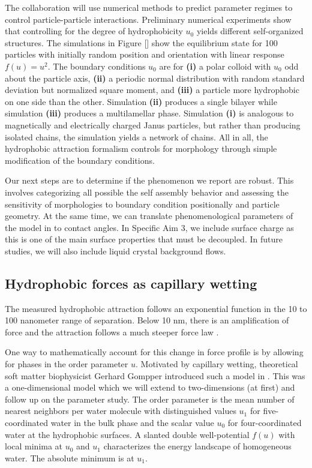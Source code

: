 The collaboration will use numerical methods to predict parameter regimes 
to control particle-particle interactions.  Preliminary numerical experiments
show that controlling for the degree of hydrophobicity $u_0$ yields different
self-organized structures.  The simulations in Figure [] show the equilibrium
state for 100 particles with initially random position and orientation
with linear response $f(u) = u^2$.  The 
boundary conditions $u_0$ are for \textbf{(i)} a polar colloid with $u_0$
odd about the particle axis, \textbf{(ii)} a periodic normal distribution
with random standard deviation but normalized square moment, and  
\textbf{(iii)} a particle more hydrophobic on one side than the other. 
Simulation \textbf{(ii)}  produces a single bilayer while simulation
\textbf{(iii)} produces a multilamellar phase.  Simulation \textbf{(i)} is
analogous to magnetically and electrically charged Janus particles, but
rather than producing isolated chains, the simulation yields a network
of chains. All in all, the hydrophobic attraction formalism controls for
morphology through simple modification of the boundary conditions.

Our next steps are to determine if the phenomenon we report are robust.
This involves categorizing all possible the self assembly behavior and
assessing the sensitivity of morphologies to boundary condition
positionally and particle geometry.  At the same time, we can translate
phenomenological parameters of the model in to contact angles. In Specific
Aim 3, we include surface charge as this is one of the main surface
properties that must be decoupled. In future studies, we will also include
liquid crystal background flows.

\subsection{Hydrophobic forces as capillary wetting} 
The measured hydrophobic attraction follows an exponential function
in the 10 to 100 nanometer range of separation.  Below 10 nm, there 
is an amplification of force and the attraction follows a much steeper 
force law \cite{Lin2005}. 

One way to mathematically account for this change in force profile is by
allowing for phases in the order parameter $u$. Motivated by capillary
wetting, theoretical soft matter biophysicist Gerhard Gompper 
introduced such a model in \cite{GoHaKo94}. This was a one-dimensional
model which we will extend to two-dimensions (at first) and follow up on
the parameter study. The order parameter is the mean number of nearest
neighbors per water molecule with distinguished values $u_1$ for
five-coordinated water in the bulk phase and the scalar value $u_0$ for
four-coordinated water at the hydrophobic surfaces. A slanted double
well-potential $f(u)$ with local minima at $u_0$ and $u_1$ characterizes
the energy landscape of homogeneous water. The absolute minimum is at $u_1$. 


